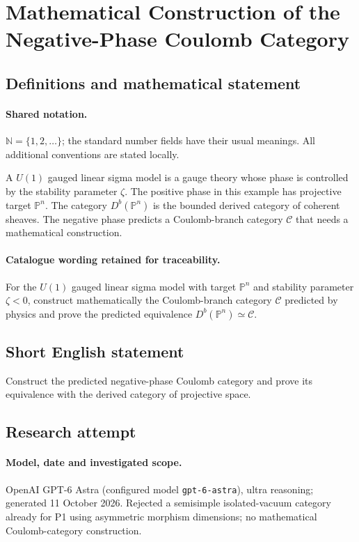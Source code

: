 \documentclass[11pt]{article}
\begin{document}
\section{Mathematical Construction of the Negative-Phase Coulomb Category}\label{statement}

\subsection{Definitions and mathematical statement}

\paragraph{Shared notation.}$\mathbb N=\{1,2,\ldots\}$; the standard number fields have their usual meanings. All additional conventions are stated locally.


A $U(1)$ gauged linear sigma model is a gauge theory whose phase is controlled by the stability parameter $\zeta$. The positive phase in this example has projective target $\mathbb P^n$. The category $D^b(\mathbb P^n)$ is the bounded derived category of coherent sheaves. The negative phase predicts a Coulomb-branch category $\mathcal C$ that needs a mathematical construction.

\paragraph{Catalogue wording retained for traceability.}
For the $U(1)$ gauged linear sigma model with target $\mathbb P^n$ and stability parameter $\zeta<0$, construct mathematically the Coulomb-branch category $\mathcal C$ predicted by physics and prove the predicted equivalence $D^b(\mathbb P^n)\simeq\mathcal C$.
\subsection{Short English statement}
Construct the predicted negative-phase Coulomb category and prove its equivalence with the derived category of projective space.
\subsection{Research attempt}
\paragraph{Model, date and investigated scope.}
OpenAI GPT-6 Astra (configured model \texttt{gpt-6-astra}), ultra reasoning; generated 11 October 2026. Rejected a semisimple isolated-vacuum category already for P1 using asymmetric morphism dimensions; no mathematical Coulomb-category construction.
\end{document}
